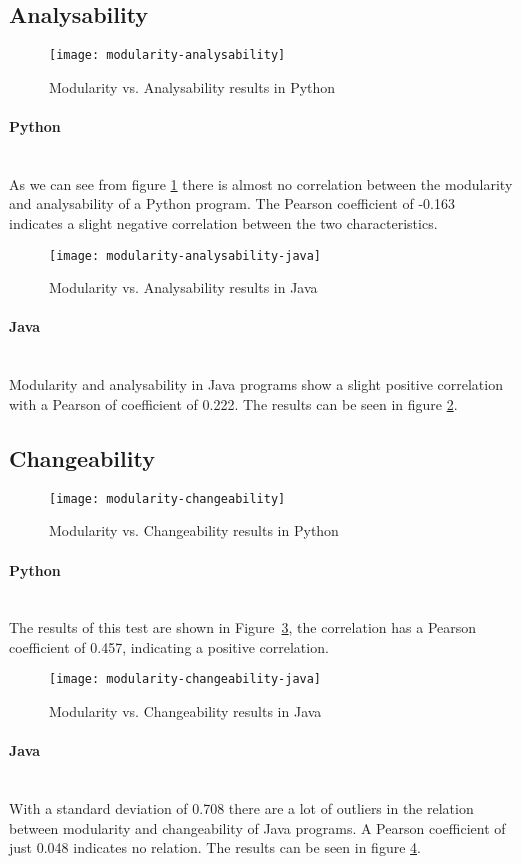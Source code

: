 \documentclass[twoside]{uva-inf-bachelor-thesis}
\newcommand{\myparagraph}[1]{\paragraph{#1}\mbox{}\\}
\begin{document}
\subsection{Analysability}

\begin{figure}[H]
    \caption{Modularity vs. Analysability results in Python}
    \label{figure:mod-analysis}
    \centering
        \texttt{[image: modularity-analysability]}
\end{figure}

\myparagraph{Python}
As we can see from figure \ref{figure:mod-analysis} there is almost no correlation between the modularity and analysability of a Python program. The Pearson coefficient of -0.163 indicates a slight negative correlation between the two characteristics.

\begin{figure}[H]
    \caption{Modularity vs. Analysability results in Java}
    \label{figure:mod-analysis-java}
    \centering
        \texttt{[image: modularity-analysability-java]}
\end{figure}

\myparagraph{Java}
Modularity and analysability in Java programs show a slight positive correlation with a Pearson of coefficient of 0.222. The results can be seen in figure \ref{figure:mod-analysis-java}.

\subsection{Changeability}

\begin{figure}[H]
    \caption{Modularity vs. Changeability results in Python}
    \label{figure:mod-change}
    \centering
        \texttt{[image: modularity-changeability]}
\end{figure}

\myparagraph{Python}
The results of this test are shown in Figure~\ref{figure:mod-change}, the correlation has a Pearson coefficient of 0.457, indicating a positive correlation.

\begin{figure}[H]
    \caption{Modularity vs. Changeability results in Java}
    \label{figure:mod-change-java}
    \centering
        \texttt{[image: modularity-changeability-java]}
\end{figure}

\myparagraph{Java}
With a standard deviation of 0.708 there are a lot of outliers in the relation between modularity and changeability of Java programs. A Pearson coefficient of just 0.048 indicates no relation. The results can be seen in figure \ref{figure:mod-change-java}.
\end{document}
